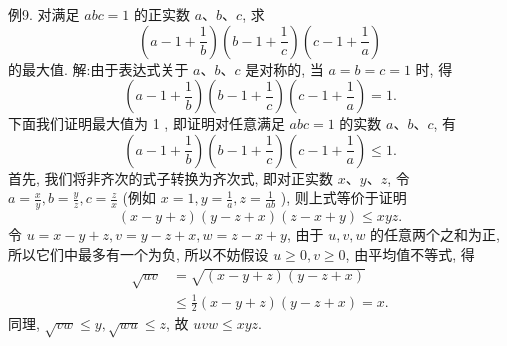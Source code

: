 例9. 对满足 $a b c=1$ 的正实数 $a 、 b 、 c$, 求
$$
\left(a-1+\frac{1}{b}\right)\left(b-1+\frac{1}{c}\right)\left(c-1+\frac{1}{a}\right)
$$
的最大值.
解:由于表达式关于 $a 、 b 、 c$ 是对称的, 当 $a=b=c=1$ 时, 得
$$
\left(a-1+\frac{1}{b}\right)\left(b-1+\frac{1}{c}\right)\left(c-1+\frac{1}{a}\right)=1 .
$$
下面我们证明最大值为 1 , 即证明对任意满足 $a b c=1$ 的实数 $a 、 b 、 c$, 有
$$
\left(a-1+\frac{1}{b}\right)\left(b-1+\frac{1}{c}\right)\left(c-1+\frac{1}{a}\right) \leqslant 1 .
$$
首先, 我们将非齐次的式子转换为齐次式, 即对正实数 $x 、 y 、 z$, 令 $a= \frac{x}{y}, b=\frac{y}{z}, c=\frac{z}{x}$ (例如 $x=1, y=\frac{1}{a}, z=\frac{1}{a b}$ ), 则上式等价于证明
$$
(x-y+z)(y-z+x)(z-x+y) \leqslant x y z .
$$
令 $u=x-y+z, v=y-z+x, w=z-x+y$, 由于 $u, v, w$ 的任意两个之和为正, 所以它们中最多有一个为负, 所以不妨假设 $u \geqslant 0, v \geqslant 0$, 由平均值不等式, 得
$$
\begin{aligned}
\sqrt{u v} & =\sqrt{(x-y+z)(y-z+x)} \\
& \leqslant \frac{1}{2}(x-y+z)(y-z+x)=x .
\end{aligned}
$$
同理, $\sqrt{v w} \leqslant y, \sqrt{w u} \leqslant z$, 故 $u v w \leqslant x y z$.



